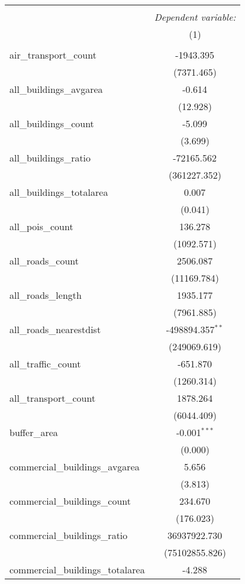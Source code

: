 \begin{table}[!htbp] \centering
\begin{tabular}{@{\extracolsep{5pt}}lc}
\\[-1.8ex]\hline
\hline \\[-1.8ex]
& \multicolumn{1}{c}{\textit{Dependent variable:}} \
\cr \cline{1-2}
\\[-1.8ex] & (1) \\
\hline \\[-1.8ex]
 air_transport_count & -1943.395$^{}$ \\
  & (7371.465) \\
 all_buildings_avgarea & -0.614$^{}$ \\
  & (12.928) \\
 all_buildings_count & -5.099$^{}$ \\
  & (3.699) \\
 all_buildings_ratio & -72165.562$^{}$ \\
  & (361227.352) \\
 all_buildings_totalarea & 0.007$^{}$ \\
  & (0.041) \\
 all_pois_count & 136.278$^{}$ \\
  & (1092.571) \\
 all_roads_count & 2506.087$^{}$ \\
  & (11169.784) \\
 all_roads_length & 1935.177$^{}$ \\
  & (7961.885) \\
 all_roads_nearestdist & -498894.357$^{**}$ \\
  & (249069.619) \\
 all_traffic_count & -651.870$^{}$ \\
  & (1260.314) \\
 all_transport_count & 1878.264$^{}$ \\
  & (6044.409) \\
 buffer_area & -0.001$^{***}$ \\
  & (0.000) \\
 commercial_buildings_avgarea & 5.656$^{}$ \\
  & (3.813) \\
 commercial_buildings_count & 234.670$^{}$ \\
  & (176.023) \\
 commercial_buildings_ratio & 36937922.730$^{}$ \\
  & (75102855.826) \\
 commercial_buildings_totalarea & -4.288$^{}$ \\

\end{tabular}
\end{table}
